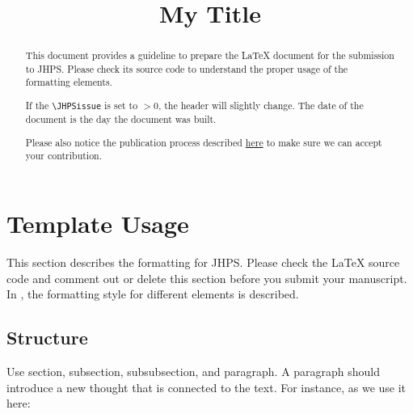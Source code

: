 \documentclass{jhps}
\begin{document}



\title{My Title}

\maketitle

\begin{abstract}
This document provides a guideline to prepare the LaTeX document for the submission to JHPS.
Please check its source code to understand the proper usage of the formatting elements.

If the \verb|\JHPSissue| is set to $>0$, the header will slightly change.
The date of the document is the day the document was built.

Please also notice the publication process described \href{https://jhps.vi4io.org/authors/#detailed-publication-process}{here} to make sure we can accept your contribution.
\end{abstract}

\setcounter{section}{-1}
\section{Template Usage}
\label{sec:usage}

This section describes the formatting for JHPS.
Please check the LaTeX source code and comment out or delete this section before you submit your manuscript.
In , the formatting style for different elements is described.

\subsection{Structure}

Use section, subsection, subsubsection, and paragraph.
A paragraph should introduce a new thought that is connected to the text.
For instance, as we use it here:
\end{document}
